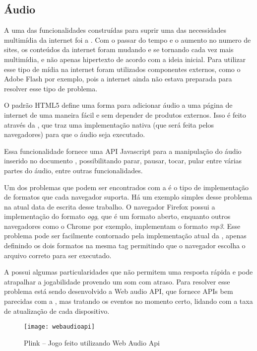\subsection{Áudio}
A uma das funcionalidades construídas para suprir uma das necessidades multimídia
da internet foi a \tagaudio. Com o passar do tempo e o aumento no
numero de sites, os conteúdos da internet foram mudando
e se tornando cada vez mais multimídia, e não apenas hipertexto de
acordo com a ideia inicial. Para utilizar esse tipo de mídia na
internet foram utilizados componentes externos, como o Adobe Flash por
exemplo, pois a internet ainda não estava preparada para resolver esse
tipo de problema.

O padrão HTML5 define uma forma para adicionar áudio a uma página de
internet de uma maneira fácil e sem depender de produtos externos.
Isso é feito através da \tagaudio, que traz uma
implementação nativa (que será feita pelos navegadores) para que o
áudio seja executado.

Essa funcionalidade fornece uma API Javascript para a manipulação do
áudio inserido no documento \cite{pfeiffer2010definitive}, possibilitando parar, pausar, tocar,
pular entre várias partes do áudio, entre outras funcionalidades.

Um dos problemas que podem ser encontrados com a \tagaudio é o tipo de
implementação de formatos que cada navegador suporta. Há um exemplo
simples desse problema na atual data de escrita desse trabalho. O
navegador Firefox possui a implementação do formato \textit{ogg}, que
é um formato aberto, enquanto outros navegadores como o Chrome por
exemplo, implementam o formato \textit{mp3}. Esse problema pode ser
facilmente contornado pela implementação atual da \tagaudio,
apenas definindo os dois formatos na mesma tag permitindo que o
navegador escolha o arquivo correto para ser executado.

A \tagaudio possui algumas particularidades que não permitem uma
resposta rápida e pode atrapalhar a jogabilidade provendo um som com
atraso. Para resolver esse problema está sendo desenvolvido a
Web audio API, que fornece APIs bem parecidas com a \tagaudio, mas
tratando os eventos no momento certo, lidando com a taxa de
atualização de cada dispositivo.

\begin{figure}[H]
  \centering
	\texttt{[image: webaudioapi]}
  \caption{Plink {--} Jogo feito utilizando Web Audio Api}
  \label{img:webaudioapi}
\end{figure}

